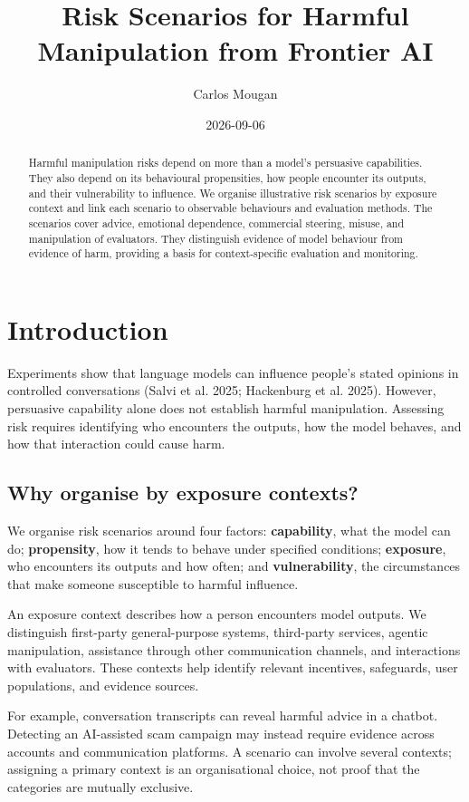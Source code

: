 \documentclass[
  english,
]{article}
\title{Risk Scenarios for Harmful Manipulation from Frontier AI}
\author{Carlos Mougan}
\date{2026-09-06}
\begin{document}
\maketitle
\begin{abstract}
Harmful manipulation risks depend on more than a model's persuasive
capabilities. They also depend on its behavioural propensities, how
people encounter its outputs, and their vulnerability to influence. We
organise illustrative risk scenarios by exposure context and link each
scenario to observable behaviours and evaluation methods. The scenarios
cover advice, emotional dependence, commercial steering, misuse, and
manipulation of evaluators. They distinguish evidence of model behaviour
from evidence of harm, providing a basis for context-specific evaluation
and monitoring.
\end{abstract}

\section{Introduction}\label{introduction}

Experiments show that language models can influence people's stated
opinions in controlled conversations (Salvi et al. 2025; Hackenburg et
al. 2025). However, persuasive capability alone does not establish
harmful manipulation. Assessing risk requires identifying who encounters
the outputs, how the model behaves, and how that interaction could cause
harm.

\subsection{Why organise by exposure
contexts?}\label{why-organise-by-exposure-contexts}

We organise risk scenarios around four factors: \textbf{capability},
what the model can do; \textbf{propensity}, how it tends to behave under
specified conditions; \textbf{exposure}, who encounters its outputs and
how often; and \textbf{vulnerability}, the circumstances that make
someone susceptible to harmful influence.

An exposure context describes how a person encounters model outputs. We
distinguish first-party general-purpose systems, third-party services,
agentic manipulation, assistance through other communication channels,
and interactions with evaluators. These contexts help identify relevant
incentives, safeguards, user populations, and evidence sources.

For example, conversation transcripts can reveal harmful advice in a
chatbot. Detecting an AI-assisted scam campaign may instead require
evidence across accounts and communication platforms. A scenario can
involve several contexts; assigning a primary context is an
organisational choice, not proof that the categories are mutually
exclusive.
\end{document}
